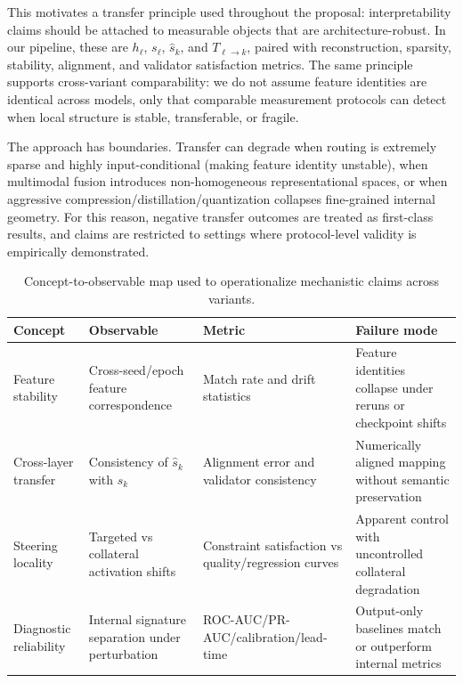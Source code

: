 \documentclass[../ppgc-tese.tex]{subfiles}
\begin{document}
This motivates a transfer principle used throughout the proposal: interpretability claims should be attached to measurable objects that are architecture-robust. In our pipeline, these are $h_\ell$, $s_\ell$, $\hat s_k$, and $T_{\ell\to k}$, paired with reconstruction, sparsity, stability, alignment, and validator satisfaction metrics. The same principle supports cross-variant comparability: we do not assume feature identities are identical across models, only that comparable measurement protocols can detect when local structure is stable, transferable, or fragile.

The approach has boundaries. Transfer can degrade when routing is extremely sparse and highly input-conditional (making feature identity unstable), when multimodal fusion introduces non-homogeneous representational spaces, or when aggressive compression/distillation/quantization collapses fine-grained internal geometry. For this reason, negative transfer outcomes are treated as first-class results, and claims are restricted to settings where protocol-level validity is empirically demonstrated.

\begin{table}[ht]
\centering
\small
\begin{tabular}{p{}p{}p{}p{}}
\hline
\textbf{Concept} & \textbf{Observable} & \textbf{Metric} & \textbf{Failure mode} \\
\hline
Feature stability & Cross-seed/epoch feature correspondence & Match rate and drift statistics & Feature identities collapse under reruns or checkpoint shifts \\
Cross-layer transfer & Consistency of $\hat s_k$ with $s_k$ & Alignment error and validator consistency & Numerically aligned mapping without semantic preservation \\
Steering locality & Targeted vs collateral activation shifts & Constraint satisfaction vs quality/regression curves & Apparent control with uncontrolled collateral degradation \\
Diagnostic reliability & Internal signature separation under perturbation & ROC-AUC/PR-AUC/calibration/lead-time & Output-only baselines match or outperform internal metrics \\
\hline
\end{tabular}
\caption{Concept-to-observable map used to operationalize mechanistic claims across variants.}
\label{tab:concept-observable-metric}
\end{table}
\end{document}
